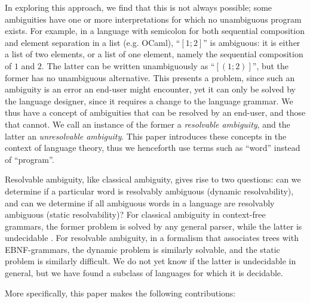 \documentclass[acmsmall,review,anonymous]{acmart}\settopmatter{printfolios=true,printccs=false,printacmref=false}
\begin{document}
In exploring this approach, we find that this is not always possible; some ambiguities have one or more interpretations for which no unambiguous program exists. For example, in a language with semicolon for both sequential composition and element separation in a list (e.g. OCaml), ``$[1; 2]$'' is ambiguous: it is either a list of two elements, or a list of one element, namely the sequential composition of $1$ and $2$. The latter can be written unambiguously as ``$[(1; 2)]$'', but the former has no unambiguous alternative. This presents a problem, since such an ambiguity is an error an end-user might encounter, yet it can only be solved by the language designer, since it requires a change to the language grammar. We thus have a concept of ambiguities that can be resolved by an end-user, and those that cannot. We call an instance of the former a \emph{resolvable ambiguity}, and the latter an \emph{unresolvable ambiguity}. This paper introduces these concepts in the context of language theory, thus we henceforth use terms such as ``word'' instead of ``program''.



Resolvable ambiguity, like classical ambiguity, gives rise to two questions: can we determine if a particular word is resolvably ambiguous (dynamic resolvability), and can we determine if all ambiguous words in a language are resolvably ambiguous (static resolvability)? For classical ambiguity in context-free grammars, the former problem is solved by any general parser, while the latter is undecidable \cite{cantorAmbiguityProblemBackus1962}. For resolvable ambiguity, in a formalism that associates trees with EBNF-grammars, the dynamic problem is similarly solvable, and the static problem is similarly difficult. We do not yet know if the latter is undecidable in general, but we have found a subclass of languages for which it is decidable.

More specifically, this paper makes the following contributions:
\end{document}
